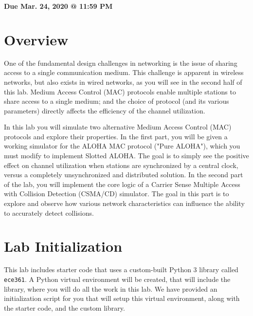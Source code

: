 \documentclass[11pt]{article}
\makeatletter
\def\datedue{Mar. 24, 2020 @ 11:59 PM}
\makeatother
\begin{document}
\maketitle \thispagestyle{fancy}

\hfill {\large \textbf{Due \datedue}}


\section{Overview}
\label{sec:overview}
One of the fundamental design challenges in networking is the issue of sharing access to a single communication medium.
This challenge is apparent in wireless networks, but also exists in wired networks, as you will see in the second half of this lab.
Medium Access Control (MAC) protocols enable multiple stations to share access to a single medium; and the choice of protocol (and its various parameters) directly affects the efficiency of the channel utilization.

In this lab you will simulate two alternative Medium Access Control (MAC) protocols and explore their properties.
In the first part, you will be given a working simulator for the ALOHA MAC protocol ("Pure ALOHA"), which you must modify to implement Slotted ALOHA.
The goal is to simply see the positive effect on channel utilization when stations are synchronized by a central clock, versus a completely unsynchronized and distributed solution.
In the second part of the lab, you will implement the core logic of a Carrier Sense Multiple Access with Collision Detection (CSMA/CD) simulator.
The goal in this part is to explore and observe how various network characteristics can influence the ability to accurately detect collisions.

\section{Lab Initialization}
\label{sec:lab-init}
This lab includes starter code that uses a custom-built Python 3 library called \texttt{ece361}.
A Python virtual environment will be created, that will include the library, where you will do all the work in this lab.
We have provided an initialization script for you that will setup this virtual environment, along with the starter code, and the custom library.
\end{document}

